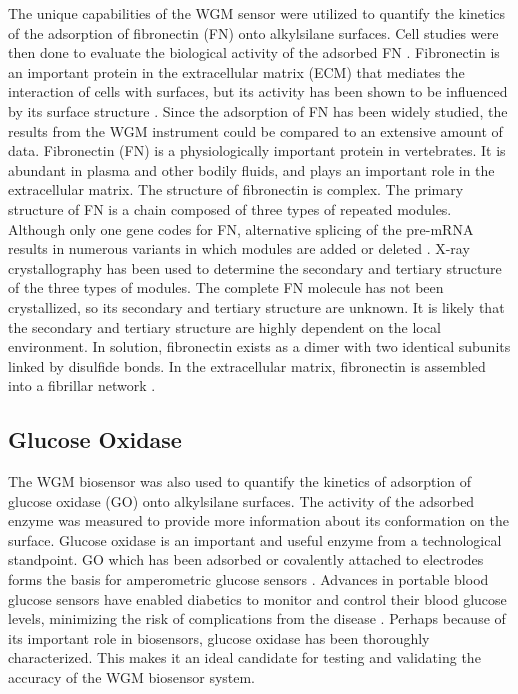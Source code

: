 The unique capabilities of the WGM sensor were utilized to quantify
the kinetics of the adsorption of fibronectin (FN) onto alkylsilane
surfaces. Cell studies were then done to evaluate the biological activity
of the adsorbed FN \cite{Keselowsky2004}. Fibronectin is an important
protein in the extracellular matrix (ECM) that mediates the interaction
of cells with surfaces, but its activity has been shown to be influenced
by its surface structure \cite{Lan2005,Michael2003}. Since the adsorption
of FN has been widely studied, the results from the WGM instrument
could be compared to an extensive amount of data. Fibronectin (FN)
is a physiologically important protein in vertebrates. It is abundant
in plasma and other bodily fluids, and plays an important role in
the extracellular matrix. The structure of fibronectin is complex.
The primary structure of FN is a chain composed of three types of
repeated modules. Although only one gene codes for FN, alternative
splicing of the pre-mRNA results in numerous variants in which modules
are added or deleted \cite{Pankov2002}. X-ray crystallography has
been used to determine the secondary and tertiary structure of the
three types of modules. The complete FN molecule has not been crystallized,
so its secondary and tertiary structure are unknown. It is likely
that the secondary and tertiary structure are highly dependent on
the local environment. In solution, fibronectin exists as a dimer
with two identical subunits linked by disulfide bonds. In the extracellular
matrix, fibronectin is assembled into a fibrillar network \cite{Mao2005}.


\subsection{Glucose Oxidase}

The WGM biosensor was also used to quantify the kinetics of adsorption
of glucose oxidase (GO) onto alkylsilane surfaces. The activity of
the adsorbed enzyme was measured to provide more information about
its conformation on the surface. Glucose oxidase is an important and
useful enzyme from a technological standpoint. GO which has been adsorbed
or covalently attached to electrodes forms the basis for amperometric
glucose sensors \cite{Wang2007}. Advances in portable blood glucose
sensors have enabled diabetics to monitor and control their blood
glucose levels, minimizing the risk of complications from the disease
\cite{Oliver2009}. Perhaps because of its important role in biosensors,
glucose oxidase has been thoroughly characterized. This makes it an
ideal candidate for testing and validating the accuracy of the WGM
biosensor system. 

